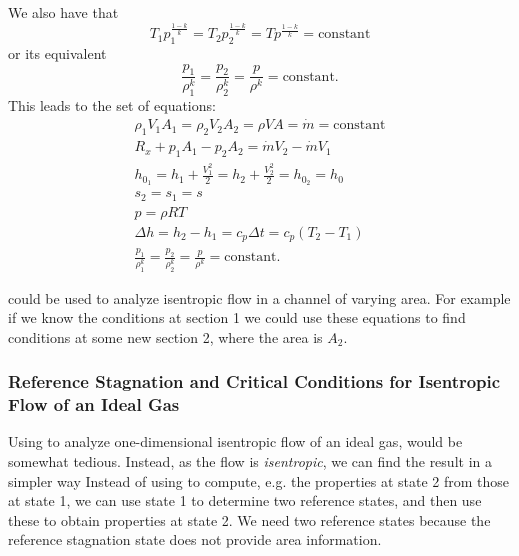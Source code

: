 We also have that
\begin{equation*}
  T_1 p_1^{\frac{1-k}{k}} = T_2 p_2^{\frac{1-k}{k}} = Tp^{\frac{1-k}{k}} = \text{constant}
\end{equation*}
or its equivalent
\begin{equation*}
  \frac{p_1}{\rho_1^{k}} = \frac{p_2}{\rho_2^{k}} = \frac{p}{\rho^{k}} = \text{constant}
.\end{equation*}
This leads to the set of equations:
\begin{gather} \label{eq:1225}
  \rho_1 V_1 A_1 = \rho_2 V_2 A_2 = \rho V A = \dot{m} = \text{constant} \\
  R_x + p_1 A_1 - p_2 A_2 = \dot{m} V_2 - \dot{m} V_1 \\
  h_{0_1} = h_1 + \frac{V_1^2}{2} = h_2 + \frac{V_2^2}{2} = h_{0_2} = h_0 \\
  s_2 = s_1 = s \\
  p = \rho RT \\
  \Delta h = h_2 - h_1 = c_p \Delta t = c_p \left( T_2 - T_1 \right) \\
  \frac{p_1}{\rho_1^{k}} = \frac{p_2}{\rho^{k}_2} = \frac{p}{\rho^{k}} = \text{constant}
.\end{gather}

 could be used to analyze isentropic flow in a channel of varying area.
For example if we know the conditions at section 1 we could use these equations to find conditions at some new section 2, where the area is $A_2$.

\subsubsection{Reference Stagnation and Critical Conditions for Isentropic Flow of an Ideal Gas}
Using  to analyze one-dimensional isentropic flow of an ideal gas, would be somewhat tedious.
Instead, as the flow is \textit{isentropic}, we can find the result in a simpler way
Instead of using  to compute, e.g. the properties at state 2 from those at state 1, we can use state 1 to determine two reference states, and then use these to obtain properties at state 2.
We need two reference states because the reference stagnation state does not provide area information.

